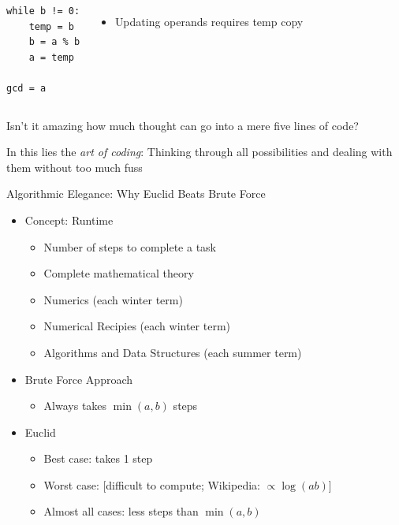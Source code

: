 \begin{frame}[fragile]
%
\begin{columns}
\begin{codebox}
\begin{verbatim}
while b != 0:
    temp = b
    b = a % b
    a = temp

gcd = a
\end{verbatim}
\end{codebox}
%
\begin{itemize}
\item Updating operands requires temp copy
\end{itemize}
\end{columns}
%
\begin{hintbox}
Isn't it amazing how much thought can go into a mere five lines of code?

In this lies the \emph{art of coding}: Thinking through all possibilities and dealing with them without too much fuss
\end{hintbox}
%
\end{frame}


\begin{frame}{Algorithmic Elegance: Why Euclid Beats Brute Force}
%
\begin{itemize}
\item Concept: Runtime
	\begin{itemize}
	\item Number of steps to complete a task
	\item Complete mathematical theory
	\item[\thus] Numerics (each winter term)
	\item[\thus] Numerical Recipies (each winter term)
	\item[\thus] Algorithms and Data Structures (each summer term)
	\end{itemize}
\item Brute Force Approach
	\begin{itemize}
	\item Always takes $\min(a, b)$ steps
	\end{itemize}
\item Euclid
	\begin{itemize}
	\item Best case: takes 1 step
	\item Worst case: [difficult to compute; Wikipedia: $\propto \log(ab)$]
	\item Almost all cases: less steps than $\min(a, b)$
	\end{itemize}
\end{itemize}
%
\end{frame}